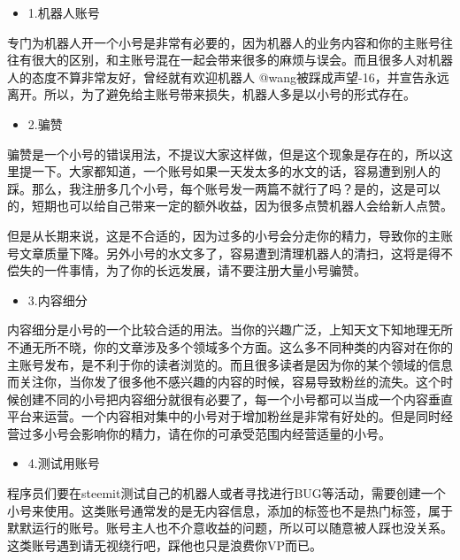 \documentclass[]{ctexbook}
\providecommand{\tightlist}{%
  \setlength{\itemsep}{0pt}\setlength{\parskip}{0pt}}
\begin{document}
\begin{itemize}
\tightlist
\item
  1.机器人账号
\end{itemize}

专门为机器人开一个小号是非常有必要的，因为机器人的业务内容和你的主账号往往有很大的区别，和主账号混在一起会带来很多的麻烦与误会。而且很多人对机器人的态度不算非常友好，曾经就有欢迎机器人 @wang被踩成声望-16，并宣告永远离开。所以，为了避免给主账号带来损失，机器人多是以小号的形式存在。

\begin{itemize}
\tightlist
\item
  2.骗赞
\end{itemize}

骗赞是一个小号的错误用法，不提议大家这样做，但是这个现象是存在的，所以这里提一下。大家都知道，一个账号如果一天发太多的水文的话，容易遭到别人的踩。那么，我注册多几个小号，每个账号发一两篇不就行了吗？是的，这是可以的，短期也可以给自己带来一定的额外收益，因为很多点赞机器人会给新人点赞。

但是从长期来说，这是不合适的，因为过多的小号会分走你的精力，导致你的主账号文章质量下降。另外小号的水文多了，容易遭到清理机器人的清扫，这将是得不偿失的一件事情，为了你的长远发展，请不要注册大量小号骗赞。

\begin{itemize}
\tightlist
\item
  3.内容细分
\end{itemize}

内容细分是小号的一个比较合适的用法。当你的兴趣广泛，上知天文下知地理无所不通无所不晓，你的文章涉及多个领域多个方面。这么多不同种类的内容对在你的主账号发布，是不利于你的读者浏览的。而且很多读者是因为你的某个领域的信息而关注你，当你发了很多他不感兴趣的内容的时候，容易导致粉丝的流失。这个时候创建不同的小号把内容细分就很有必要了，每一个小号都可以当成一个内容垂直平台来运营。一个内容相对集中的小号对于增加粉丝是非常有好处的。但是同时经营过多小号会影响你的精力，请在你的可承受范围内经营适量的小号。

\begin{itemize}
\tightlist
\item
  4.测试用账号
\end{itemize}

程序员们要在steemit测试自己的机器人或者寻找进行BUG等活动，需要创建一个小号来使用。这类账号通常发的是无内容信息，添加的标签也不是热门标签，属于默默运行的账号。账号主人也不介意收益的问题，所以可以随意被人踩也没关系。这类账号遇到请无视绕行吧，踩他也只是浪费你VP而已。
\end{document}

